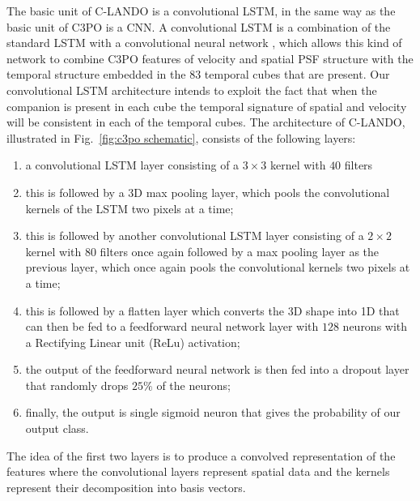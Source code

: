 \documentclass{aa}
\begin{document}
The basic unit of C-LANDO is a convolutional LSTM, in the same way as the basic unit of C3PO is a CNN. A convolutional LSTM is a combination of the standard LSTM \citep{1997HocherieterLSTM} with a convolutional neural network \citep{1990ZhangCNN}, which allows this kind of network to combine C3PO features of velocity and spatial PSF structure with the temporal structure embedded in the $83$ temporal cubes that are present. 
Our convolutional LSTM architecture intends to exploit the fact that when the companion is present in each cube the temporal signature of spatial and velocity will be consistent in each of the temporal cubes.
The architecture of C-LANDO, illustrated in Fig.~\ref{fig:c3po schematic}, consists of the following layers:
\begin{enumerate}
    \item a convolutional LSTM layer consisting of a $3\times3$ kernel with $40$ filters 
    \item  this is followed by a 3D max pooling layer, which pools the convolutional kernels of the LSTM two pixels at a time;
    \item this is followed by another convolutional LSTM layer consisting of a $2\times2$ kernel with $80$ filters once again followed by a max pooling layer as the previous layer, which once again pools the convolutional kernels two pixels at a time;
    \item  this is followed by a flatten layer which converts the 3D shape into 1D that can then be fed to a feedforward neural network layer  with $128$ neurons with a Rectifying Linear unit (ReLu) activation;
    \item the output of the feedforward neural network is then fed into a dropout layer that randomly drops $25\%$ of the neurons;
    \item finally, the output is single sigmoid neuron that gives the probability of our output class.
\end{enumerate}
The idea of the first two layers is to produce a convolved representation of the features where the convolutional layers represent spatial data and the kernels represent their decomposition into basis vectors.
\end{document}
